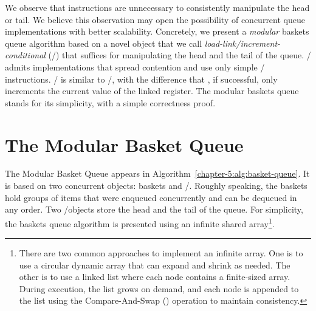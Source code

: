 We observe that \RMW{} instructions are unnecessary to consistently manipulate the head or tail. We believe this observation may open the possibility of concurrent queue implementations with better scalability. Concretely, we present a \emph{modular} baskets queue algorithm based on a novel object that we call \emph{load-link/increment-conditional} (\LL/\IC) that suffices for manipulating the head and the tail of the queue.  \LL/\IC{} admits implementations that spread contention and use only simple \R/\W{} instructions.  \LL/\IC{} is similar to \LL/\SC, with the difference that \IC, if successful, only increments the current value of the linked register. The modular baskets queue stands for its simplicity, with a simple correctness proof.

\section{\label{sec-basket-queue}The Modular Basket Queue}


The Modular Basket Queue appears in Algorithm~\ref{chapter-5:alg:basket-queue}. It is based on two concurrent objects: baskets and \LL/\IC. Roughly speaking, the baskets hold groups of items that were enqueued concurrently and can be dequeued in any order. Two \LL/\IC objects store the head and the tail of the queue. For simplicity, the baskets queue algorithm is presented using an infinite shared array\footnote{There are two common approaches to implement an infinite array. One is to use a circular dynamic array that can expand and shrink as needed. The other is to use a linked list where each node contains a finite-sized array. During execution, the list grows on demand, and each node is appended to the list using the Compare-And-Swap (\CAS) operation to maintain consistency.}.

